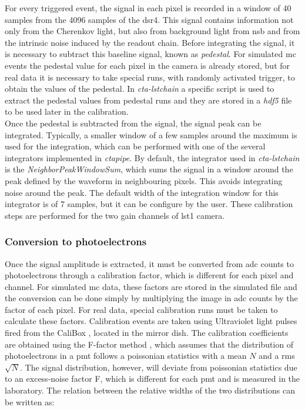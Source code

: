\documentclass[main.tex]{subfiles}
\begin{document}
For every triggered event, the signal in each pixel is recorded in a window of 40 samples from the 4096 samples of the \gls{dsr4}. This signal contains information not only from the Cherenkov light, but also from background light from \gls{nsb} and from the intrinsic noise induced by the readout chain. Before integrating the signal, it is necessary to subtract this baseline signal, known as \textit{pedestal}. For simulated \gls{mc} events the pedestal value for each pixel in the camera is already stored, but for real data it is necessary to take special runs, with randomly activated trigger, to obtain the values of the pedestal. In \textit{cta-lstchain} a specific script is used to extract the pedestal values from pedestal runs and they are stored in a \textit{hdf5} file to be used later in the calibration.\\
Once the pedestal is subtracted from the signal, the signal peak can be integrated. Typically, a smaller window of a few samples around the maximum is used for the integration, which can be performed with one of the several integrators implemented in \textit{ctapipe}. By default, the integrator used in \textit{cta-lstchain} is the \textit{NeighborPeakWindowSum}, which sums the signal in a window around the peak defined by the waveform in neighbouring pixels. This avoids integrating noise around the peak. The default width of the integration window for this integrator is of 7 samples, but it can be configure by the user. These calibration steps are performed for the two gain channels of \gls{lst}1 camera. 

\subsubsection{Conversion to photoelectrons}

Once the signal amplitude is extracted, it must be converted from \gls{adc} counts to photoelectrons through a calibration factor, which is different for each pixel and channel. For simulated \gls{mc} data, these factors are stored in the simulated file and the conversion can be done simply by multiplying the image in \gls{adc} counts by the factor of each pixel. For real data, special calibration runs must be taken to calculate these factors. Calibration events are taken using Ultraviolet light pulses fired from the CaliBox \cite{2015CaliBox}, \cite{2019CaliBox} located in the mirror dish. The calibration coefficients are obtained using the F-factor method \cite{1997calibrationPMT}, which assumes that the distribution of photoelectrons in a \gls{pmt} follows a poissonian statistics with a mean $N$ and a \gls{rms} $\sqrt{N}$. The signal distribution, however, will deviate from poissonian statistics due to an excess-noise factor F, which is different for each \gls{pmt} and is measured in the laboratory. The relation between the relative widths of the two distributions can be written as:
\end{document}
